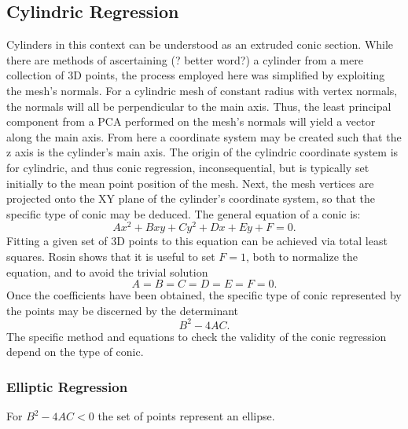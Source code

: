 \subsection{Cylindric Regression}
Cylinders in this context can be understood as an extruded conic section.
While there are methods of ascertaining (? better word?) a cylinder from a mere collection of 3D points\cite{PCL_cyl_regression}, the process employed here was simplified by exploiting the mesh's normals.
For a cylindric mesh of constant radius with vertex normals, the normals will all be perpendicular to the main axis.
Thus, the least principal component from a PCA performed on the mesh's normals will yield a vector along the main axis.
From here a coordinate system may be created such that the z axis is the cylinder's main axis.
The origin of the cylindric coordinate system is for cylindric, and thus conic regression, inconsequential, but is typically set initially to the mean point position of the mesh.
Next, the mesh vertices are projected onto the XY plane of the cylinder's coordinate system, so that the specific type of conic may be deduced.
The general equation of a conic is:
\begin{equation}\label{eq:gen_conic}
	Ax^2 + Bxy + Cy^2 + Dx + Ey + F = 0.
\end{equation}
Fitting a given set of 3D points to this equation can be achieved via total least squares.
Rosin shows that it is useful to set $F = 1$\cite{Ellipse_least_squares}, both to normalize the equation, and to avoid the trivial solution
\begin{equation}
	A = B = C = D = E = F = 0.
\end{equation}
Once the coefficients have been obtained, the specific type of conic represented by the points may be discerned by the determinant
\begin{equation*}
	B^2 - 4AC.
\end{equation*}
The specific method and equations to check the validity of the conic regression depend on the type of conic.

\subsubsection{Elliptic Regression}\label{sec:elliptic_reg}
For $B^2 - 4AC < 0$ the set of points represent an ellipse.

